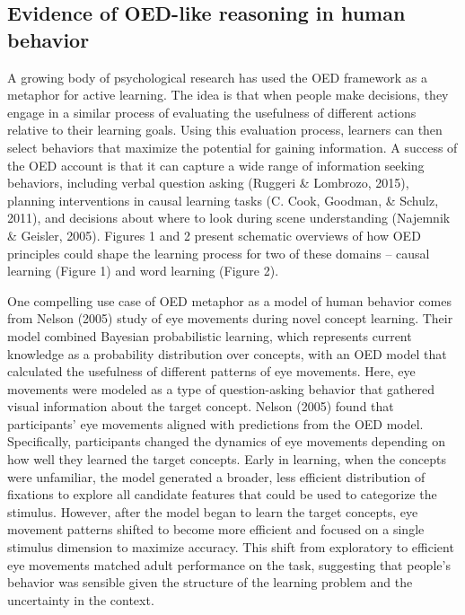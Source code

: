 \documentclass[oneside]{report}
\begin{document}
\subsection{Evidence of OED-like reasoning in human
behavior}\label{evidence-of-oed-like-reasoning-in-human-behavior}

A growing body of psychological research has used the OED framework as a
metaphor for active learning. The idea is that when people make
decisions, they engage in a similar process of evaluating the usefulness
of different actions relative to their learning goals. Using this
evaluation process, learners can then select behaviors that maximize the
potential for gaining information. A success of the OED account is that
it can capture a wide range of information seeking behaviors, including
verbal question asking (Ruggeri \& Lombrozo, 2015), planning
interventions in causal learning tasks (C. Cook, Goodman, \& Schulz,
2011), and decisions about where to look during scene understanding
(Najemnik \& Geisler, 2005). Figures 1 and 2 present schematic overviews
of how OED principles could shape the learning process for two of these
domains -- causal learning (Figure 1) and word learning (Figure 2).

One compelling use case of OED metaphor as a model of human behavior
comes from Nelson (2005) study of eye movements during novel concept
learning. Their model combined Bayesian probabilistic learning, which
represents current knowledge as a probability distribution over
concepts, with an OED model that calculated the usefulness of different
patterns of eye movements. Here, eye movements were modeled as a type of
question-asking behavior that gathered visual information about the
target concept. Nelson (2005) found that participants' eye movements
aligned with predictions from the OED model. Specifically, participants
changed the dynamics of eye movements depending on how well they learned
the target concepts. Early in learning, when the concepts were
unfamiliar, the model generated a broader, less efficient distribution
of fixations to explore all candidate features that could be used to
categorize the stimulus. However, after the model began to learn the
target concepts, eye movement patterns shifted to become more efficient
and focused on a single stimulus dimension to maximize accuracy. This
shift from exploratory to efficient eye movements matched adult
performance on the task, suggesting that people's behavior was sensible
given the structure of the learning problem and the uncertainty in the
context.
\end{document}
